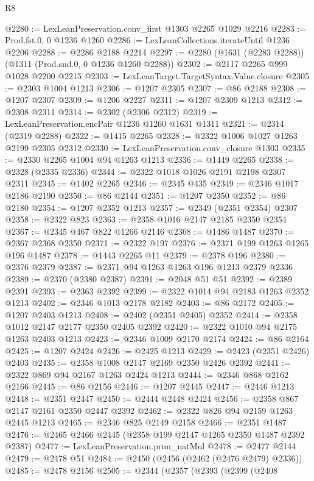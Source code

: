 \begin{lexlean}{R8}
\begin{coremodule}
@2280 := LexLeanPreservation.conv_first @1303 @2265 @1029 @2216
@2283 := Prod.fst.{0, 0} @1236 @1260
@2286 := LexLeanCollections.iterateUntil @1236 @2206
@2288 := @2286 @2188 @2214
@2297 := @2280 (@1631 (@2283 @2288)) (@1311 (Prod.snd.{0, 0} @1236 @1260 @2288))
@2302 := @2117 @2265 @999 @1028 @2200 @2215
@2303 := LexLeanTarget.TargetSyntax.Value.closure
@2305 := @2303 @1004 @1213
@2306 := @1207 @2305
@2307 := @86 @2188
@2308 := @1207 @2307
@2309 := @1206 @2227
@2311 := @1207 @2309 @1213
@2312 := @2308 @2311
@2314 := @2302 (@2306 @2312)
@2319 := LexLeanPreservation.encPair @1236 @1260 @1631 @1311
@2321 := @2314 (@2319 @2288)
@2322 := @1415 @2265
@2328 := @2322 @1006 @1027 @1263 @2199 @2305 @2312
@2330 := LexLeanPreservation.conv_closure @1303
@2335 := @2330 @2265 @1004 @94 @1263 @1213
@2336 := @1449 @2265
@2338 := @2328 (@2335 @2336)
@2344 := @2322 @1018 @1026 @2191 @2198 @2307 @2311
@2345 := @1402 @2265
@2346 := @2345 @435
@2349 := @2346 @1017 @2186 @2190
@2350 := @86 @2144
@2351 := @1207 @2350
@2352 := @86 @2180
@2354 := @1207 @2352 @1213
@2357 := @2349 (@2351 @2354) @2307
@2358 := @2322 @823
@2363 := @2358 @1016 @2147 @2185 @2350 @2354
@2367 := @2345 @467 @822 @1266 @2146
@2368 := @1486 @1487
@2370 := @2367 @2368 @2350
@2371 := @2322 @197
@2376 := @2371 @199 @1263 @1265 @196 @1487
@2378 := @1443 @2265 @11
@2379 := @2378 @196
@2380 := @2376 @2379
@2387 := @2371 @94 @1263 @1263 @196 @1213 @2379 @2336
@2389 := @2370 (@2380 @2387)
@2391 := @2048 @51 @51
@2392 := @2389 @2391
@2393 := @2363 @2392
@2399 := @2322 @1014 @94 @2183 @1263 @2352 @1213
@2402 := @2346 @1013 @2178 @2182
@2403 := @86 @2172
@2405 := @1207 @2403 @1213
@2408 := @2402 (@2351 @2405) @2352
@2414 := @2358 @1012 @2147 @2177 @2350 @2405 @2392
@2420 := @2322 @1010 @94 @2175 @1263 @2403 @1213
@2423 := @2346 @1009 @2170 @2174
@2424 := @86 @2164
@2425 := @1207 @2424
@2426 := @2425 @1213
@2429 := @2423 (@2351 @2426) @2403
@2435 := @2358 @1008 @2147 @2169 @2350 @2426 @2392
@2441 := @2322 @869 @94 @2167 @1263 @2424 @1213
@2444 := @2346 @868 @2162 @2166
@2445 := @86 @2156
@2446 := @1207 @2445
@2447 := @2446 @1213
@2448 := @2351 @2447
@2450 := @2444 @2448 @2424
@2456 := @2358 @867 @2147 @2161 @2350 @2447 @2392
@2462 := @2322 @826 @94 @2159 @1263 @2445 @1213
@2465 := @2346 @825 @2149 @2158
@2466 := @2351 @1487
@2476 := @2465 @2466 @2445 (@2358 @199 @2147 @1265 @2350 @1487 @2392 @2387)
@2477 := LexLeanPreservation.prim_natMul
@2478 := @2477 @2144
@2479 := @2478 @51
@2484 := @2450 (@2456 (@2462 (@2476 @2479) @2336))
@2485 := @2478 @2156
@2505 := @2344
    (@2357
      (@2393
        (@2399
          (@2408

\end{coremodule}
\end{lexlean}
